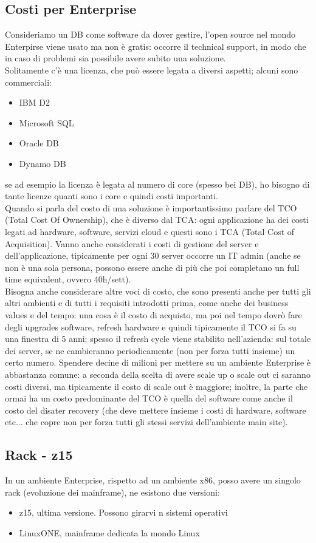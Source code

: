 \documentclass{article}
\begin{document}
\subsection{Costi per Enterprise}
Consideriamo un DB come software da dover gestire, l'open source nel mondo Enterpirse viene usato ma non è gratis: occorre il technical support, in modo che in caso di problemi sia possibile avere subito una soluzione.\\ Solitamente c'è una licenza, che può essere legata a diversi aspetti; alcuni sono commerciali:
\begin{itemize}
\item IBM D2
\item Microsoft SQL
\item Oracle DB
\item Dynamo DB
\end{itemize}
se ad esempio la licenza è legata al numero di core (spesso bei DB), ho bisogno di tante licenze quanti sono i core e quindi costi importanti.\\ Quando si parla del costo di una soluzione è importantissimo parlare del TCO (Total Cost Of Ownership), che è diverso dal TCA: ogni applicazione ha dei costi legati ad hardware, software, servizi cloud e questi sono i TCA (Total Cost of Acquisition). Vanno anche considerati i costi di gestione del server e dell'applicazione, tipicamente per ogni 30 server occorre un IT admin (anche se non è una sola persona, possono essere anche di più che poi completano un full time equivalent, ovvero 40h/sett).\\ Bisogna anche considerare altre voci di costo, che sono presenti anche per tutti gli altri ambienti e di tutti i requisiti introdotti prima, come anche dei business values e del tempo: una cosa è il costo di acquisto, ma poi nel tempo dovrò fare degli upgrades software, refresh hardware e quindi tipicamente il TCO si fa su una finestra di 5 anni; spesso il refresh cycle viene stabilito nell'azienda: sul totale dei server, se ne cambieranno periodicamente (non per forza tutti insieme) un certo numero. Spendere decine di milioni per mettere su un ambiente Enterprise è abbastanza comune: a seconda della scelta di avere scale up o scale out ci saranno costi diversi, ma tipicamente il costo di scale out è maggiore; inoltre, la parte che ormai ha un costo predominante del TCO è quella del software come anche il costo del disater recovery (che deve mettere insieme i costi di hardware, software etc... che copre non per forza tutti gli stessi servizi dell'ambiente main site).
\subsection{Rack - z15}
In un ambiente Enterprise, rispetto ad un ambiente x86, posso avere un singolo rack (evoluzione dei mainframe), ne esistono due versioni:
\begin{itemize}
\item z15, ultima versione. Possono girarvi n sistemi operativi
\item LinuxONE, mainframe dedicata la mondo Linux
\end{itemize}
\end{document}
